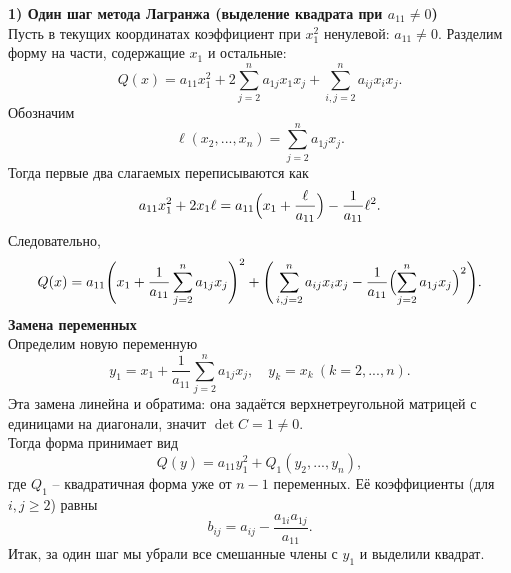 \documentclass[14pt]{extreport}
\begin{document}
    \begin{prbox}
        \textbf{1) Один шаг метода Лагранжа (выделение квадрата при $a_{11} \neq 0$)}\\
        Пусть в текущих координатах коэффициент при $x_1^2$ ненулевой: $a_{11} \neq 0$. Разделим форму на части, содержащие $x_1$ и остальные:
        \[
        Q(x) = a_{11}x_1^2 + 2\sum_{j=2}^n a_{1j}x_1x_j + \sum_{i,j=2}^n a_{ij}x_ix_j.
        \]
        Обозначим
        \[
        \ell (x_2,...,x_n) = \sum_{j=2}^n a_{1j}x_j.
        \]
        Тогда первые два слагаемых переписываются как
        \[
        a_{11}x_1^2 + 2x_1\ell = a_{11} \Bigl( x_1 + \frac{\ell}{a_{11}} \Bigr) - \frac{1}{a_{11}}\ell^2.
        \]
        Следовательно,
        \[
        Q(x) = a_{11} \Bigg( x_1 + \frac{1}{a_{11}} \sum_{j=2}^n a_{1j}x_j \Bigg) ^2 + \Bigg( \sum_{i,j=2}^n a_{ij}x_ix_j - \frac{1}{a_{11}} \Bigl( \sum_{j=2}^n a_{1j}x_j \Bigr) ^2 \Bigg).
        \]
        \textbf{Замена переменных}\\
        Определим новую переменную
        \[
        y_1 = x_1 + \frac{1}{a_{11}} \sum_{j=2}^n a_{1j}x_j, \quad y_k = x_k\ (k=2,...,n).
        \]
        Эта замена линейна и обратима: она задаётся верхнетреугольной матрицей с единицами на диагонали, значит $\det C = 1 \neq 0$.\\
        Тогда форма принимает вид
        \[
        Q(y) = a_{11}y_1^2 + Q_1(y_2,...,y_n),
        \]
        где $Q_1$ – квадратичная форма уже от $n-1$ переменных. Её коэффициенты (для $i,j \geq 2$) равны
        \[
        b_{ij} = a_{ij} - \frac{a_{1i} a_{1j}}{a_{11}}.
        \]
        Итак, за один шаг мы убрали все смешанные члены с $y_1$ и выделили квадрат.


\end{prbox}
\end{document}
